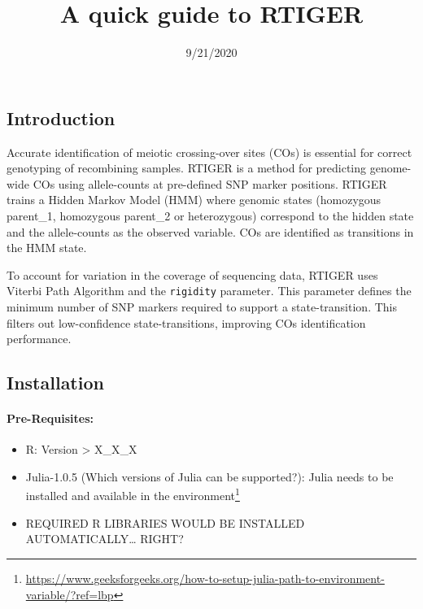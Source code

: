 \documentclass[]{article}
\title{A quick guide to RTIGER}
\author{}
\date{9/21/2020}
\providecommand{\tightlist}{%
  \setlength{\itemsep}{0pt}\setlength{\parskip}{0pt}}
\let\oldparagraph\paragraph
\renewcommand{\paragraph}[1]{\oldparagraph{#1}\mbox{}}
\let\rmarkdownfootnote\footnote%
\def\footnote{\protect\rmarkdownfootnote}
\begin{document}
\maketitle

\hypertarget{introduction}{%
\subsection{Introduction}\label{introduction}}

Accurate identification of meiotic crossing-over sites (COs) is
essential for correct genotyping of recombining samples. RTIGER is a
method for predicting genome-wide COs using allele-counts at pre-defined
SNP marker positions. RTIGER trains a Hidden Markov Model (HMM) where
genomic states (homozygous parent\_1, homozygous parent\_2 or
heterozygous) correspond to the hidden state and the allele-counts as
the observed variable. COs are identified as transitions in the HMM
state.

To account for variation in the coverage of sequencing data, RTIGER uses
Viterbi Path Algorithm and the \texttt{rigidity} parameter. This
parameter defines the minimum number of SNP markers required to support
a state-transition. This filters out low-confidence state-transitions,
improving COs identification performance.\\

\hypertarget{installation}{%
\subsection{Installation}\label{installation}}

\hypertarget{pre-requisites}{%
\paragraph{Pre-Requisites:}\label{pre-requisites}}

\begin{itemize}
\tightlist
\item
  R: Version \textgreater{} X\_X\_X
\item
  Julia-1.0.5 (Which versions of Julia can be supported?): Julia needs
  to be installed and available in the environment\footnote{\url{https://www.geeksforgeeks.org/how-to-setup-julia-path-to-environment-variable/?ref=lbp}}
\item
  REQUIRED R LIBRARIES WOULD BE INSTALLED AUTOMATICALLY\ldots{} RIGHT?
\end{itemize}
\end{document}
